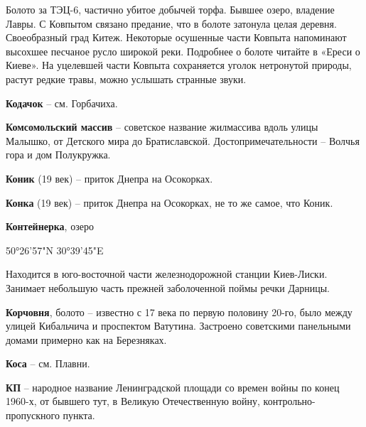 Болото за ТЭЦ-6, частично убитое добычей торфа. Бывшее озеро, владение Лавры. С Ковпытом связано предание, что в болоте затонула целая деревня. Своеобразный град Китеж. Некоторые осушенные части Ковпыта напоминают высохшее песчаное русло широкой реки. Подробнее о болоте читайте в «Ереси о Киеве». На уцелевшей части Ковпыта сохраняется уголок нетронутой природы, растут редкие травы, можно услышать странные звуки.\\

\medskip

\textbf{Кодачок} – см. Горбачиха.\\

\medskip

\textbf{Комсомольский массив} – советское название жилмассива вдоль улицы Малышко, от Детского мира до Братиславской. Достопримечательности – Волчья гора и дом Полукружка.\\

\medskip

\textbf{Коник} (19 век) – приток Днепра на Осокорках.\\

\medskip


\textbf{Конка} (19 век) – приток Днепра на 
Осокорках, не то же самое, что Коник.\\

\medskip

\textbf{Контейнерка}, озеро

50°26'57"N 30°39'45"E

Находится в юго-восточной части железнодорожной станции Киев-Лиски. Занимает небо\-льшую часть прежней заболоченной поймы речки Дарницы.\\

\medskip


\textbf{Корчовня}, болото – известно с 17 века по первую половину 20-го, было между улицей Кибальчича и проспектом Ватутина. Застроено советскими панельными домами примерно как на Березняках.\\

\medskip

\textbf{Коса} – см. Плавни.\\

\medskip

\textbf{КП} – народное название Ленинградской площади со времен войны по конец 1960-х, от бывшего тут, в Великую Отечественную войну, кон\-трольно-пропускного пункта.\\ 

\medskip


